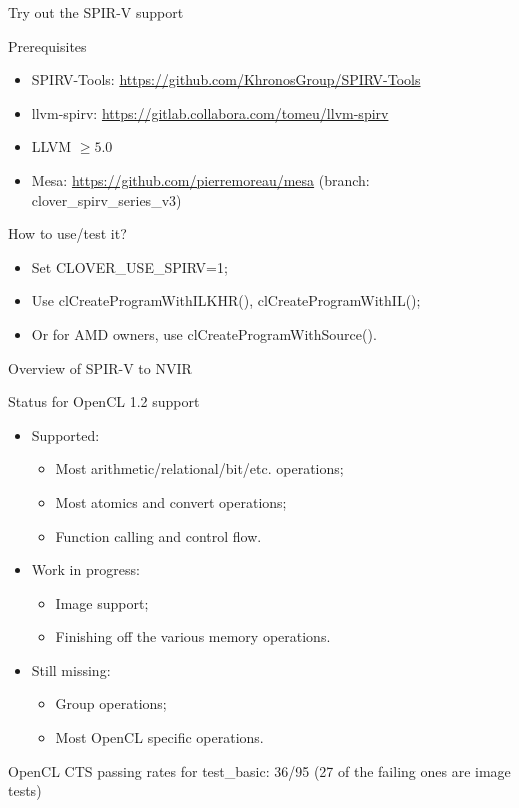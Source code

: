 \documentclass[11pt,english,compress]{beamer}
\begin{document}
\begin{frame}{Try out the SPIR-V support}
	\begin{block}{Prerequisites}
		\begin{itemize}
			\item SPIRV-Tools:
				\url{https://github.com/KhronosGroup/SPIRV-Tools}
			\item llvm-spirv:
				\url{https://gitlab.collabora.com/tomeu/llvm-spirv}
			\item LLVM $\geq 5.0$
			\item Mesa: \url{https://github.com/pierremoreau/mesa}
				(branch: clover\_spirv\_series\_v3)
		\end{itemize}
	\end{block}
	\begin{block}{How to use/test it?}
		\begin{itemize}
			\item Set CLOVER\_USE\_SPIRV=1;
			\item Use clCreateProgramWithILKHR(), clCreateProgramWithIL();
			\item Or for AMD owners, use clCreateProgramWithSource().
		\end{itemize}
	\end{block}
\end{frame}

\begin{frame}{Overview of SPIR-V to NVIR}
	\begin{block}{Status for OpenCL 1.2 support}
		\begin{itemize}
			\item Supported:
			\begin{itemize}
				\item Most arithmetic/relational/bit/etc. operations;
				\item Most atomics and convert operations;
				\item Function calling and control flow.
			\end{itemize}
			\item Work in progress:
			\begin{itemize}
				\item Image support;
				\item Finishing off the various memory operations.
			\end{itemize}
			\item Still missing:
			\begin{itemize}
				\item Group operations;
				\item Most OpenCL specific operations.
			\end{itemize}
		\end{itemize}

		OpenCL CTS passing rates for test\_basic: 36/95 (27 of the
		failing ones are image tests)
	\end{block}
\end{frame}
\end{document}
